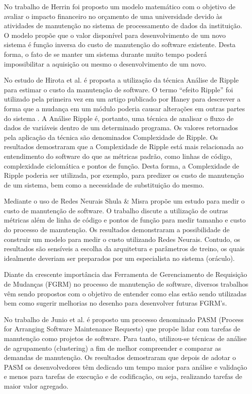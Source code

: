 \documentclass[msc,proposal,hidelot,hideabstract]{ppgccufmg} %
\begin{document}
No trabalho de Herrin \cite{Herrin:1985:SMC:323287.323383} foi proposto um modelo matemático com o
objetivo de avaliar o impacto financeiro no orçamento de uma universidade devido às atividades de manutenção no sistema de processamento de dados da instituição. O modelo propõe que o valor disponível para desenvolvimento de um novo sistema é função inversa do custo de manutenção do software existente. Desta forma, o fato de se manter um sistema durante muito tempo poderá impossibilitar a aquisição ou mesmo o desenvolvimento de um novo.

No estudo de Hirota et al. \cite{hirota1994approach} é proposta a utilização da técnica Análise de Ripple para estimar o custo da manutenção de software. O termo ``efeito Ripple'' foi utilizado pela primeira vez em um artigo publicado por Haney \cite{haney1972module} para descrever a forma que a mudança em um módulo poderia causar alterações em outras partes do sistema \cite{bilal2005using}. A Análise Ripple é, portanto, uma técnica de analisar o fluxo de dados de variáveis dentro de um determinado programa. Os valores retornados pela aplicação da técnica são denominados Complexidade de Ripple. Os resultados demostraram que a Complexidade de Ripple está mais relacionada ao entendimento do
software do que as métricas padrão, como linhas de código, complexidade ciclomática e pontos de função. Desta forma, a Complexidade de Ripple poderia ser utilizada, por exemplo, para predizer os custo de manutenção de um sistema, bem como a necessidade de substituição do mesmo.

Mediante o uso de Redes Neurais Shula \& Misra
\cite{Shukla:2008:ESM:1342211.1342232} propõe um estudo para medir o custo de
manutenção de software. O trabalho discute a utilização de outras métricas além
de linha de código e pontos de função para medir  tamanho e custo do processo de manutenção. Os resultados demonstraram a possibilidade de construir um modelo para medir o custo utilizando Redes Neurais. Contudo, os resultados são sensíveis a escolha da arquitetura e parâmetros de treino, os quais idealmente deveriam ser preparados por um especialista no sistema (oráculo).

Diante da crescente importância das Ferramenta de Gerenciamento de Requisição de Mudanças (FGRM) no processo de manutenção de software, diversos trabalhos vêm sendo propostos com o objetivo de entender como elas estão sendo utilizadas bem como sugerir melhorias no desenho para desenvolver futuras FGRM's.

No trabalho de Junio et al. \cite{5741246} é proposto um processo denominado PASM (Process for Arranging
Software Maintenance Requests) que propõe lidar com tarefas de manutenção como projetos de software. Para tanto, utilizou-se técnicas de análise de agrupamento (clustering) a fim de melhor compreender e comparar as demandas de manutenção. Os resultados demostraram que depois de adotar o PASM os
desenvolvedores têm dedicado um tempo maior para análise e validação e menos para tarefas de execução e de codificação, ou seja, realizando tarefas de maior valor agregado.
\end{document}
